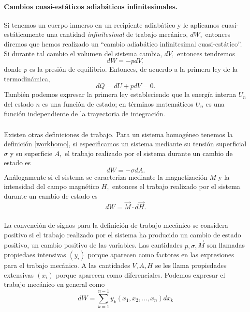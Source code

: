 \documentclass{article}
\theoremstyle{definition} \newtheorem{defi}{Definici\'on}
\theoremstyle{definition} \newtheorem{teo}{Teorema}
\theoremstyle{definition} \newtheorem{cor}{Corolario}
\begin{document}
\paragraph{Cambios cuasi-est\'aticos adiab\'aticos infinitesimales.}
Si tenemos un cuerpo inmerso en un recipiente adiab\'atico y le aplicamos cuasi-est\'aticamente una cantidad \emph{infinitesimal} de trabajo mec\'anico, $dW,$ entonces diremos que hemos realizado un ``cambio adiab\'atico infinitesimal cuasi-est\'atico''. Si durante tal cambio el volumen del sistema cambia, $dV,$ entonces tendremos
\begin{equation}\label{workhomo}
dW = -p dV,
\end{equation}
donde $p$ es la presi\'on de equilibrio. Entonces, de acuerdo a la primera ley de la termodin\'amica,
\begin{equation}\label{adiab1}
dQ = dU + p dV = 0.
\end{equation}
Tambi\'en podemos expresar la primera ley estableciendo que la energ\'ia interna $U_n$ del estado $n$ es una funci\'on de estado; en t\'erminos matem\'aticos $U_n$ es una funci\'on independiente de la trayectoria de integraci\'on.
\subparagraph{}
Existen otras definiciones de trabajo. Para un sistema homog\'eneo tenemos la definici\'on \eqref{workhomo}, si especificamos un sistema mediante su tensi\'on superficial $\sigma$ y su superficie $A,$ el trabajo realizado por el sistema durante un cambio de estado es
\begin{equation}
dW = -\sigma dA.
\end{equation}
An\'alogamente si el sistema se caracteriza mediante la magnetizaci\'on $M$ y la intensidad del campo magn\'etico $H,$ entonces el trabajo realizado por el sistema durante un cambio de estado es
\begin{equation}
dW = \vec M\cdot d\vec H.
\end{equation}
\subparagraph{}
La convenci\'on de signos para la definici\'on de trabajo mec\'anico se considera positivo si el trabajo realizado por el sistema ha producido un cambio de estado positivo, un cambio positivo de las variables. Las cantidades $p, \sigma, \vec M$ son llamadas propiedaes intensivas $(y_i)$ porque aparecen como factores en las expresiones para el trabajo mec\'anico. A las cantidades $V, A, H$ se les llama propiedades extensivas $(x_i)$ porque aparecen como diferenciales. Podemos expresar el trabajo mec\'anico en general como
\begin{equation}
dW = \sum_{k=1}^{n-1} y_k (x_1,x_2,\dots,x_n) dx_k
\end{equation}
\end{document}
